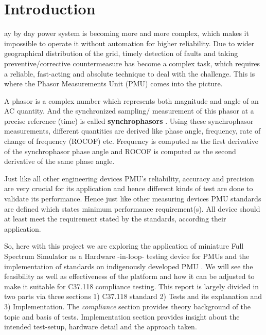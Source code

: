 \section{Introduction}
ay by day power system is becoming more and more complex, which makes it impossible to operate it without automation for higher reliability. Due to wider geographical distribution of the grid, timely detection of faults and taking preventive/corrective countermeasure  has become a complex task, which requires a reliable, fast-acting and absolute technique to deal with the challenge. This is where the Phasor Measurements Unit (PMU) comes into the picture. 

A phasor is a complex number which represents both magnitude and angle of an AC quantity. And the synchronized sampling/ measurement of this phasor at a precise reference (time) is called \textbf{synchrophasors} \cite{std:c37}. Using these synchrophasor measurements, different quantities are derived like phase angle, frequency, rate of change of frequency (ROCOF) etc. Frequency is computed as the first derivative of the synchrophasor phase angle and ROCOF is computed as the second derivative of the same phase angle. 

Just like all other engineering devices PMU's reliability, accuracy  and precision are very crucial for its application and hence different kinds of test are done to validate its performance. Hence just like other measuring devices PMU standards are defined which states minimum performance requirement(s). All device should at least meet the requirement stated by the standards, according their application. 

So, here with this project we are exploring the application of miniature Full Spectrum Simulator as a Hardware -in-loop- testing device for PMUs and the implementation of standards on indigenously developed PMU . We will see the feasibility as well as effectiveness of the platform and how it can be adjusted to make it suitable for C37.118 compliance testing. This report is largely divided in two parts via three sections 1) C37.118 standard 2) Tests and its explanation and 3) Implementation. The \textit{compliance} section provides theory background of the topic and basis of tests. Implementation section provides insight about the intended test-setup, hardware detail and the approach taken. 

